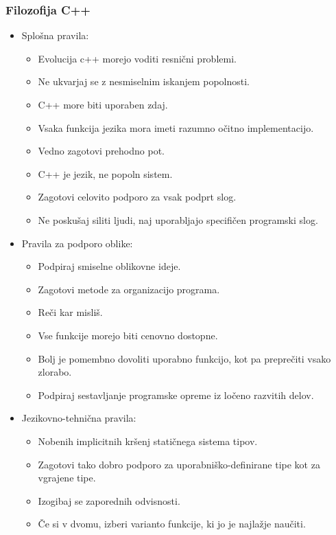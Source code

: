 \documentclass[12pt,titlepage]{report}
\begin{document}
			\subsubsection{Filozofija C++ \cite{cpp_wiki,cpp_evolution}}
				\begin{itemize}
					\item Splošna pravila:
					\begin{itemize}
						\item Evolucija c++ morejo voditi resnični problemi.
						\item Ne ukvarjaj se z nesmiselnim iskanjem popolnosti.
						\item C++ more biti uporaben zdaj.
						\item Vsaka funkcija jezika mora imeti razumno očitno implementacijo.
						\item Vedno zagotovi prehodno pot.
						\item C++ je jezik, ne popoln sistem.
						\item Zagotovi celovito podporo za vsak podprt slog.
						\item Ne poskušaj siliti ljudi, naj uporabljajo specifičen programski slog.
					\end{itemize}
					\item Pravila za podporo oblike:
					\begin{itemize}
						\item Podpiraj smiselne oblikovne ideje.
						\item Zagotovi metode za organizacijo programa.
						\item Reči kar misliš.
						\item Vse funkcije morejo biti cenovno dostopne.
						\item Bolj je pomembno dovoliti uporabno funkcijo, kot pa preprečiti vsako zlorabo.
						\item Podpiraj sestavljanje programske opreme iz ločeno razvitih delov.
					\end{itemize}
					\item Jezikovno-tehnična pravila:
					\begin{itemize}
						\item Nobenih implicitnih kršenj statičnega sistema tipov.
						\item Zagotovi tako dobro podporo za uporabniško-definirane tipe kot za vgrajene tipe.
						\item Izogibaj se zaporednih odvisnosti.
						\item Če si v dvomu, izberi varianto funkcije, ki jo je najlažje naučiti. %

\end{itemize}
\end{itemize}
\end{document}
